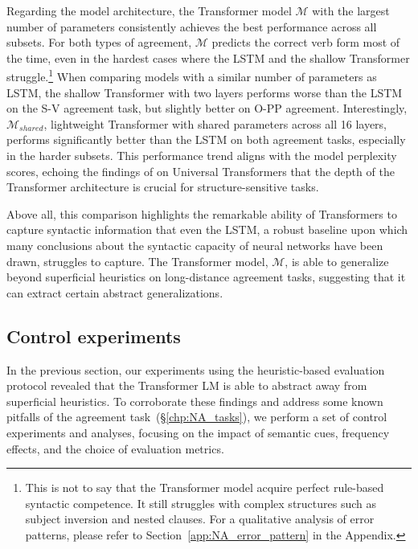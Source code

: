 Regarding the model architecture, the Transformer model $\mathcal{M}$ with the largest number of parameters consistently achieves the best performance across all subsets. For both types of agreement, $\mathcal{M}$ predicts the correct verb form most of the time, even in the hardest cases where the LSTM and the shallow Transformer struggle.\footnote{This is not to say that the Transformer model acquire perfect rule-based syntactic competence. It still struggles with complex structures such as subject inversion and nested clauses. For a qualitative analysis of error patterns, please refer to Section~\ref{app:NA_error_pattern} in the Appendix.} When comparing models with a similar number of parameters as LSTM, the shallow Transformer with two layers performs worse than the LSTM on the S-V agreement task, but slightly better on O-PP agreement. Interestingly, $\mathcal{M}_{shared}$, lightweight Transformer with shared parameters across all 16 layers, performs significantly better than the LSTM on both agreement tasks, especially in the harder subsets. This performance trend aligns with the model perplexity scores, echoing the findings of \cite{dehghani2018universal} on Universal Transformers that the depth of the Transformer architecture is crucial for structure-sensitive tasks.

Above all, this comparison highlights the remarkable ability of Transformers to capture syntactic information that even the LSTM, a robust baseline upon which many conclusions about the syntactic capacity of neural networks have been drawn, struggles to capture. The Transformer model, $\mathcal{M}$, is able to generalize beyond superficial heuristics on long-distance agreement tasks, suggesting that it can extract certain abstract generalizations. 

\subsection{Control experiments}
In the previous section, our experiments using the heuristic-based evaluation protocol revealed that the Transformer LM is able to abstract away from superficial heuristics. To corroborate these findings and address some known pitfalls of the
agreement task~(\S\ref{chp:NA_tasks}), we perform a set of control experiments and analyses, focusing on the impact of semantic cues, frequency effects, and the choice of evaluation metrics.



